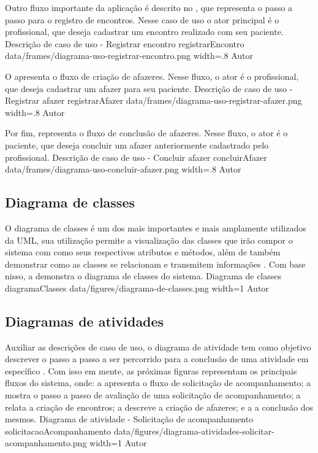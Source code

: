 Outro fluxo importante da aplicação é descrito no , que representa o passo a passo para o registro de encontros. Nesse caso de uso o ator principal é o profissional, que deseja cadastrar um encontro realizado com seu paciente.
\customFrame
    {Descrição de caso de uso - Registrar encontro}
    {registrarEncontro}
    {data/frames/diagrama-uso-registrar-encontro.png}
    {width=.8\textwidth}
    {Autor}


O  apresenta o fluxo de criação de afazeres. Nesse fluxo, o ator é o profissional, que deseja cadastrar um afazer para seu paciente.
\customFrame
    {Descrição de caso de uso - Registrar afazer}
    {registrarAfazer}
    {data/frames/diagrama-uso-registrar-afazer.png}
    {width=.8\textwidth}
    {Autor}

Por fim,  representa o fluxo de conclusão de afazeres. Nesse fluxo, o ator é o paciente, que deseja concluir um afazer anteriormente cadastrado pelo profissional.
\customFrame
    {Descrição de caso de uso - Concluir afazer}
    {concluirAfazer}
    {data/frames/diagrama-uso-concluir-afazer.png}
    {width=.8\textwidth}
    {Autor}


\subsection{Diagrama de classes}
\label{sec:diagramaDeClasses}

O diagrama de classes é um dos mais importantes e mais amplamente utilizados da UML, sua utilização permite a visualização das classes que irão compor o sistema com como seus respectivos atributos e métodos, além de também demonstrar como as classes se relacionam e transmitem informações \cite{Guedes2018}. Com base nisso, a  demonstra o diagrama de classes do sistema. 
\image
    {Diagrama de classes}
    {diagramaClasses}
    {data/figures/diagrama-de-classes.png}
    {width=1\textwidth}
    {Autor}

\subsection{Diagramas de atividades}
\label{sec:diagramaDeAtividades}

Auxiliar as descrições de caso de uso, o diagrama de atividade tem como objetivo descrever o passo a passo a ser percorrido para a conclusão de uma atividade em específico \cite{Guedes2018}. Com isso em mente, as próximas figuras representam os principais fluxos do sistema, onde: a  apresenta o fluxo de solicitação de acompanhamento; a  mostra o passo a passo de avaliação de uma solicitação de acompanhamento; a  relata a criação de encontros; a  descreve a criação de afazeres; e a  a conclusão dos mesmos.
\image
    {Diagrama de atividade - Solicitação de acompanhamento}
    {solicitacaoAcompanhamento}
    {data/figures/diagrama-atividades-solicitar-acompanhamento.png}
    {width=1\textwidth}
    {Autor}

